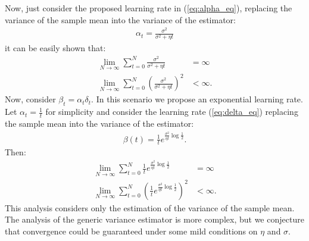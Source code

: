 \documentclass[conference]{IEEEtran}
\begin{document}
Now, just consider the proposed learning rate in (\ref{eq:alpha_eq}), replacing the variance of the sample mean into the variance of the estimator:
\begin{align}\label{eq:alpha_smv}
 \alpha_t=\frac{\sigma^2}{\sigma^2+\eta t}
\end{align}
it can be easily shown that:
\begin{align}
 \lim_{N\rightarrow\infty} \sum_{t=0}^{N}\frac{\sigma^2}{\sigma^2+\eta t} & = \infty \\
 \lim_{N\rightarrow\infty} \sum_{t=0}^{N}\left(\frac{\sigma^2}{\sigma^2+\eta t}\right)^2 & < \infty.
\end{align}
Now, consider $\beta_t=\alpha_t\delta_t$. In this scenario we propose an exponential learning rate. Let $\alpha_t=\frac{1}{t}$ for simplicity and consider the learning rate (\ref{eq:delta_eq}) replacing the sample mean into the variance of the estimator:
\begin{align}\label{eq:beta_delta_smv}
 \beta(t) = \frac{1}{t}e^{\frac{\sigma^2}{\eta t}\log\frac{1}{2}}.
\end{align}
Then:
\begin{align}
 \lim_{N\rightarrow\infty} \sum_{t=0}^{N}\frac{1}{t}e^{\frac{\sigma^2}{\eta t}\log\frac{1}{2}} & = \infty \\
 \lim_{N\rightarrow\infty} \sum_{t=0}^{N}\left(\frac{1}{t}e^{\frac{\sigma^2}{\eta t}\log\frac{1}{2}}\right)^2 & < \infty.
\end{align}
This analysis considers only the estimation of the variance of the sample mean. The analysis of the generic variance estimator is more complex, but we conjecture that convergence could be guaranteed under some mild conditions on $\eta$ and $\sigma$.
\end{document}

